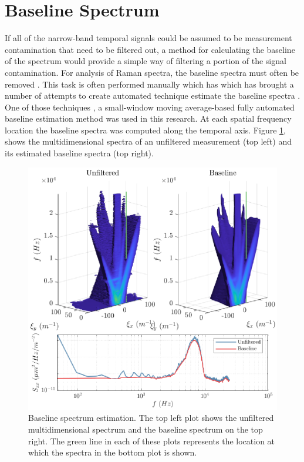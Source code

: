 \section{Baseline Spectrum}
If all of the narrow-band temporal signals could be assumed to be measurement contamination that need to be filtered out, a method for calculating the baseline of the spectrum would provide a simple way of filtering a portion of the signal contamination.
For analysis of Raman spectra, the baseline spectra must often be removed \cite{Schulze-2012-GmyAqzC7}.
This task is often performed manually which has which has brought a number of attempts to create automated technique estimate the baseline spectra \cite{Mosier-Boss-1995-keK3ckUN, Schulze-2005-QkUeywxD, Schulze-2012-GmyAqzC7, Zhao-2007-HAc6j8Wb}.
One of those techniques \cite{Schulze-2012-GmyAqzC7}, a small-window moving average-based fully automated baseline estimation method was used in this research.
At each spatial frequency location the baseline spectra was computed along the temporal axis.
Figure \ref{fig:06_filter_baseline}, shows the multidimensional spectra of an unfiltered measurement (top left) and its estimated baseline spectra (top right).
\begin{figure}
  \centering
  \includegraphics{../matlab/06_single_sensor_filtering/filter_baseline.eps}
  \caption{Baseline spectrum estimation. The top left plot shows the unfiltered multidimensional spectrum and the baseline spectrum on the top right. The green line in each of these plots represents the location at which the spectra in the bottom plot is shown.}
  \label{fig:06_filter_baseline}
\end{figure}
